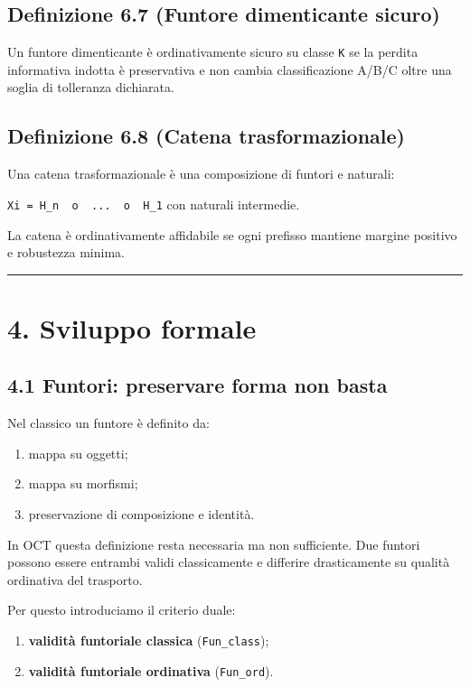 \subsection{Definizione 6.7 (Funtore dimenticante sicuro)}

Un funtore dimenticante è ordinativamente sicuro su classe \texttt{K} se la perdita informativa indotta è preservativa e non cambia classificazione A/B/C oltre una soglia di tolleranza dichiarata.

\subsection{Definizione 6.8 (Catena trasformazionale)}

Una catena trasformazionale è una composizione di funtori e naturali:

\texttt{Xi\ =\ H\_n\ \ o\ \ ...\ \ o\ \ H\_1} con naturali intermedie.

La catena è ordinativamente affidabile se ogni prefisso mantiene margine positivo e robustezza minima.

\begin{center}\rule{0.5\linewidth}{0.5pt}\end{center}

\section{4. Sviluppo formale}

\subsection{4.1 Funtori: preservare forma non basta}

Nel classico un funtore è definito da:

\begin{enumerate}
\def\labelenumi{\arabic{enumi}.}
\tightlist
\item
  mappa su oggetti;
\item
  mappa su morfismi;
\item
  preservazione di composizione e identità.
\end{enumerate}

In OCT questa definizione resta necessaria ma non sufficiente. Due funtori possono essere entrambi validi classicamente e differire drasticamente su qualità ordinativa del trasporto.

Per questo introduciamo il criterio duale:

\begin{enumerate}
\def\labelenumi{\arabic{enumi}.}
\tightlist
\item
  \textbf{validità funtoriale classica} (\texttt{Fun\_class});
\item
  \textbf{validità funtoriale ordinativa} (\texttt{Fun\_ord}).
\end{enumerate}

